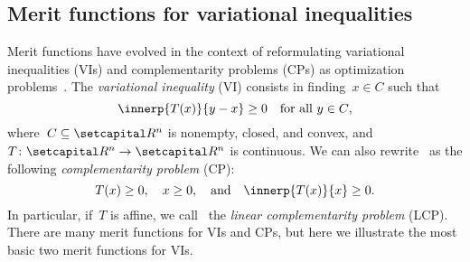 \documentclass[../../main]{subfiles}
\begin{document}
\subsection{Merit functions for variational inequalities}
Merit functions have evolved in the context of reformulating variational inequalities (VIs) and complementarity problems (CPs) as optimization problems~\cite{Fukushima1996}.
The \emph{variational inequality} (VI) consists in finding~$x \in C$ such that
\begin{equation} \label{eq:VI}
    \innerp{T(x)}{y - x} \ge 0 \forallcondition{y \in C}
    ,\end{equation}
where~$C \subseteq \setR^n$ is nonempty, closed, and convex, and~$T \colon \setR^n \to \setR^n$ is continuous.
We can also rewrite~ as the following \emph{complementarity problem} (CP):
\begin{equation} \label{eq:CP}
    T(x) \ge 0, \quad x \ge 0, \eqand \innerp{T(x)}{x} \ge 0
    .\end{equation}
In particular, if~$T$ is affine, we call~ the \emph{linear complementarity problem} (LCP).
There are many merit functions for VIs and CPs, but here we illustrate the most basic two merit functions for VIs.
\end{document}
